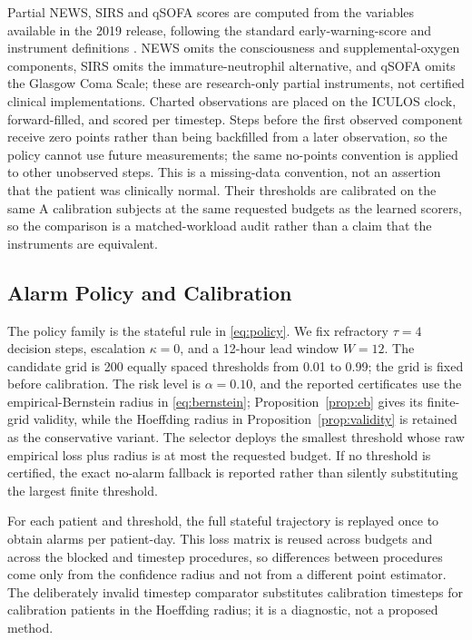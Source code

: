 Partial NEWS, SIRS and qSOFA scores are computed from the variables available in the 2019 release, following the standard early-warning-score and instrument definitions \cite{price2023evaluating,candel2023development}. NEWS omits the consciousness and supplemental-oxygen components, SIRS omits the immature-neutrophil alternative, and qSOFA omits the Glasgow Coma Scale; these are research-only partial instruments, not certified clinical implementations. Charted observations are placed on the ICULOS clock, forward-filled, and scored per timestep. Steps before the first observed component receive zero points rather than being backfilled from a later observation, so the policy cannot use future measurements; the same no-points convention is applied to other unobserved steps. This is a missing-data convention, not an assertion that the patient was clinically normal. Their thresholds are calibrated on the same A calibration subjects at the same requested budgets as the learned scorers, so the comparison is a matched-workload audit rather than a claim that the instruments are equivalent.

\subsection{Alarm Policy and Calibration}

The policy family is the stateful rule in \cref{eq:policy}. We fix refractory $\tau=4$ decision steps, escalation $\kappa=0$, and a 12-hour lead window $W=12$. The candidate grid is 200 equally spaced thresholds from 0.01 to 0.99; the grid is fixed before calibration. The risk level is $\alpha=0.10$, and the reported certificates use the empirical-Bernstein radius in \cref{eq:bernstein}; Proposition~\ref{prop:eb} gives its finite-grid validity, while the Hoeffding radius in Proposition~\ref{prop:validity} is retained as the conservative variant. The selector deploys the smallest threshold whose raw empirical loss plus radius is at most the requested budget. If no threshold is certified, the exact no-alarm fallback is reported rather than silently substituting the largest finite threshold.

For each patient and threshold, the full stateful trajectory is replayed once to obtain alarms per patient-day. This loss matrix is reused across budgets and across the blocked and timestep procedures, so differences between procedures come only from the confidence radius and not from a different point estimator. The deliberately invalid timestep comparator substitutes calibration timesteps for calibration patients in the Hoeffding radius; it is a diagnostic, not a proposed method.

